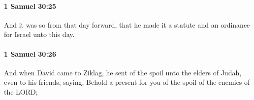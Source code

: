 		\paragraph{1 Samuel 30:25} %
			\label{1SAMUEL-30-25}

			And it was so from that day forward, that he made it a statute and an ordinance for Israel unto this day.


		\paragraph{1 Samuel 30:26} %
			\label{1SAMUEL-30-26}

			And when David came to Ziklag, he sent of the spoil unto the elders of Judah, even to his friends, saying, Behold a present for you of the spoil of the enemies of the LORD;


